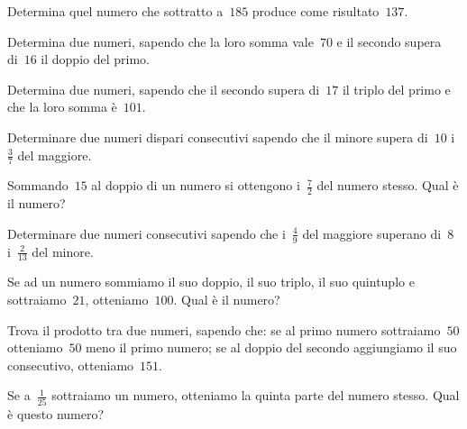 \begin{multicols}{2}
\begin{esercizio}[\Ast]
\label{ese:16.1}
Determina quel numero che sottratto a~$185$ produce come risultato~$137$.
\end{esercizio}

\begin{esercizio}[\Ast]
\label{ese:16.2}
Determina due numeri, sapendo che la loro somma vale~$70$ e il secondo supera di~$16$ il doppio del primo.
\end{esercizio}

\begin{esercizio}[\Ast]
\label{ese:16.3}
Determina due numeri, sapendo che il secondo supera di~$17$ il triplo del primo e che la loro somma è~$101$.
\end{esercizio}

\begin{esercizio}[\Ast]
\label{ese:16.4}
Determinare due numeri dispari consecutivi sapendo che il minore supera di~$10$ i~$\frac{3}{7}$ del maggiore.
\end{esercizio}

\begin{esercizio}[\Ast]
\label{ese:16.5}
Sommando~$15$ al doppio di un numero si ottengono i~$\frac{7}{2}$ del numero stesso. Qual è il numero?
\end{esercizio}

\begin{esercizio}
\label{ese:16.6}
Determinare due numeri consecutivi sapendo che i~$\frac{4}{9}$ del maggiore superano di~$8$ i~$\frac{2}{13}$ del minore.
\end{esercizio}

\begin{esercizio}[\Ast]
\label{ese:16.7}
Se ad un numero sommiamo il suo doppio, il suo triplo, il suo quintuplo e sottraiamo~$21$, otteniamo~$100$. Qual è il numero?
\end{esercizio}

\begin{esercizio}[\Ast]
\label{ese:16.8}
Trova il prodotto tra due numeri, sapendo che: se al primo numero sottraiamo~$50$ otteniamo~$50$ meno il primo numero; se al doppio del secondo aggiungiamo il suo consecutivo, otteniamo~$151$.
\end{esercizio}

\begin{esercizio}[\Ast]
\label{ese:16.9}
Se a~$\frac{1}{25}$ sottraiamo un numero, otteniamo la quinta parte del numero stesso. Qual è questo numero?
\end{esercizio}


\end{multicols}
